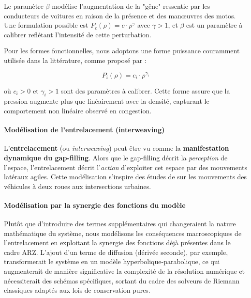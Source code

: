Le paramètre $\beta$ modélise l'augmentation de la "gêne" ressentie par les conducteurs de voitures en raison de la présence et des manœuvres des motos. Une formulation possible est $P_c(\rho) = c \cdot \rho^\gamma$ avec $\gamma > 1$, et $\beta$ est un paramètre à calibrer reflétant l'intensité de cette perturbation.

Pour les formes fonctionnelles, nous adoptons une forme puissance couramment utilisée dans la littérature, comme proposé par \cite{Aw2000} :

\begin{equation}
    P_i(\rho) = c_i \cdot \rho^{\gamma_i}
\end{equation}

où $c_i > 0$ et $\gamma_i > 1$ sont des paramètres à calibrer. Cette forme assure que la pression augmente plus que linéairement avec la densité, capturant le comportement non linéaire observé en congestion.

\paragraph{Modélisation de l'entrelacement (interweaving)}
L'\textbf{entrelacement} (ou \textit{interweaving}) peut être vu comme la \textbf{manifestation dynamique du gap-filling}. Alors que le gap-filling décrit la \textit{perception} de l'espace, l'entrelacement décrit l'\textit{action} d'exploiter cet espace par des mouvements latéraux agiles. Cette modélisation s'inspire des études de \cite{Sermpis2005} sur les mouvements des véhicules à deux roues aux intersections urbaines.

\paragraph{Modélisation par la synergie des fonctions du modèle}
Plutôt que d'introduire des termes supplémentaires qui changeraient la nature mathématique du système, nous modélisons les conséquences macroscopiques de l'entrelacement en exploitant la synergie des fonctions déjà présentes dans le cadre ARZ. L'ajout d'un terme de diffusion (dérivée seconde), par exemple, transformerait le système en un modèle hyperbolique-parabolique, ce qui augmenterait de manière significative la complexité de la résolution numérique et nécessiterait des schémas spécifiques, sortant du cadre des solveurs de Riemann classiques adaptés aux lois de conservation pures.

